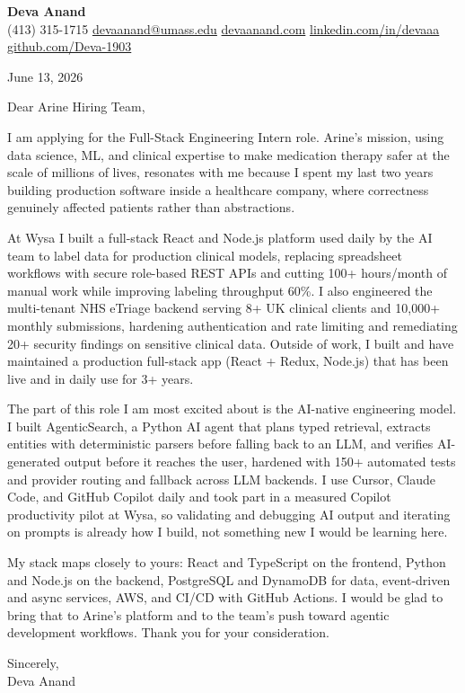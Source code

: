 \documentclass[letterpaper,11pt]{article}
\begin{document}
\begin{center}
  {\LARGE \bfseries \textcolor{ResumeNavy}{Deva Anand}} \\ \vspace{3pt}
  \small
  (413) 315-1715 \enspace\textbar\enspace
  \href{mailto:devaanand@umass.edu}{devaanand@umass.edu} \enspace\textbar\enspace
  \href{https://devaanand.com}{devaanand.com} \enspace\textbar\enspace
  \href{https://linkedin.com/in/devaaa/}{linkedin.com/in/devaaa} \enspace\textbar\enspace
  \href{https://github.com/Deva-1903}{github.com/Deva-1903}
\end{center}
\vspace{4pt}

June 13, 2026

Dear Arine Hiring Team,

I am applying for the Full-Stack Engineering Intern role. Arine's mission, using data science, ML, and clinical expertise to make medication therapy safer at the scale of millions of lives, resonates with me because I spent my last two years building production software inside a healthcare company, where correctness genuinely affected patients rather than abstractions.

At Wysa I built a full-stack React and Node.js platform used daily by the AI team to label data for production clinical models, replacing spreadsheet workflows with secure role-based REST APIs and cutting 100+ hours/month of manual work while improving labeling throughput 60\%. I also engineered the multi-tenant NHS eTriage backend serving 8+ UK clinical clients and 10,000+ monthly submissions, hardening authentication and rate limiting and remediating 20+ security findings on sensitive clinical data. Outside of work, I built and have maintained a production full-stack app (React + Redux, Node.js) that has been live and in daily use for 3+ years.

The part of this role I am most excited about is the AI-native engineering model. I built AgenticSearch, a Python AI agent that plans typed retrieval, extracts entities with deterministic parsers before falling back to an LLM, and verifies AI-generated output before it reaches the user, hardened with 150+ automated tests and provider routing and fallback across LLM backends. I use Cursor, Claude Code, and GitHub Copilot daily and took part in a measured Copilot productivity pilot at Wysa, so validating and debugging AI output and iterating on prompts is already how I build, not something new I would be learning here.

My stack maps closely to yours: React and TypeScript on the frontend, Python and Node.js on the backend, PostgreSQL and DynamoDB for data, event-driven and async services, AWS, and CI/CD with GitHub Actions. I would be glad to bring that to Arine's platform and to the team's push toward agentic development workflows. Thank you for your consideration.

\vspace{2pt}
Sincerely, \\
Deva Anand
\end{document}
